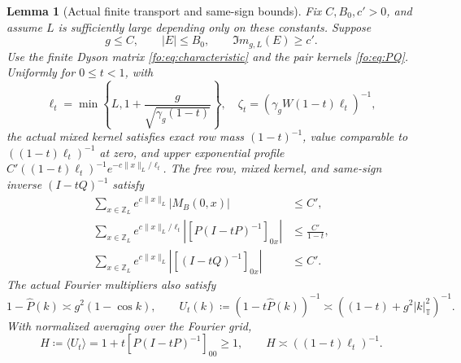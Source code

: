 \documentclass[11pt]{article}
\numberwithin{equation}{section}
\newtheorem{lemma}[theorem]{Lemma}
\theoremstyle{remark}
\newcommand{\Z}{\mathbb Z}
\begin{document}
\begin{lemma}[Actual finite transport and same-sign bounds]\label{ba:lem:kernels}
Fix $C,B_0,c'>0$, and assume $L$ is sufficiently large depending only
on these constants. Suppose
\begin{equation}\label{bl:eq:intrinsic}
 g\le C,\qquad |E|\le B_0,\qquad \Im m_{g,L}(E)\ge c'.
\end{equation}
Use the finite Dyson matrix \eqref{fo:eq:characteristic} and the pair
kernels \eqref{fo:eq:PQ}. Uniformly for $0\le t<1$, with
\begin{equation}\label{ba:eq:controls}
 \ell_t=\min\left\{L,1+\frac{g}{\sqrt{\gamma_g(1-t)}}\right\},\quad
 \zeta_t=(\gamma_g W(1-t)\ell_t)^{-1},
\end{equation}
the actual mixed kernel satisfies exact row mass $(1-t)^{-1}$,
value comparable to $((1-t)\ell_t)^{-1}$ at zero, and upper exponential profile
$C'((1-t)\ell_t)^{-1}e^{-c\|x\|_L/\ell_t}$.
The free row, mixed kernel, and same-sign inverse $(I-tQ)^{-1}$ satisfy
\begin{equation}\label{ba:eq:weighted-rows}
 \begin{aligned}
 \sum_{x\in\Z_L}e^{c\|x\|_L}|M_B(0,x)|&\le C',\\
 \sum_{x\in\Z_L}e^{c\|x\|_L/\ell_t}
       |[P(I-tP)^{-1}]_{0x}|&\le \frac{C'}{1-t},\\
 \sum_{x\in\Z_L}e^{c\|x\|_L}|[(I-tQ)^{-1}]_{0x}|&\le C'.
 \end{aligned}
\end{equation}
The actual Fourier multipliers also satisfy
\begin{equation}\label{ba:eq:coercivity}
 1-\widehat P(k)\asymp g^2(1-\cos k),\qquad
 U_t(k)\coloneqq (1-t\widehat P(k))^{-1}
       \asymp((1-t)+g^2|k|_{\mathbb T}^2)^{-1}.
\end{equation}
With normalized averaging over the Fourier grid,
\begin{equation}\label{ba:eq:inverse-average}
 H\coloneqq\langle U_t\rangle
 =1+t[P(I-tP)^{-1}]_{00}\ge1,\qquad
 H\asymp((1-t)\ell_t)^{-1}.
\end{equation}
\end{lemma}
\end{document}
